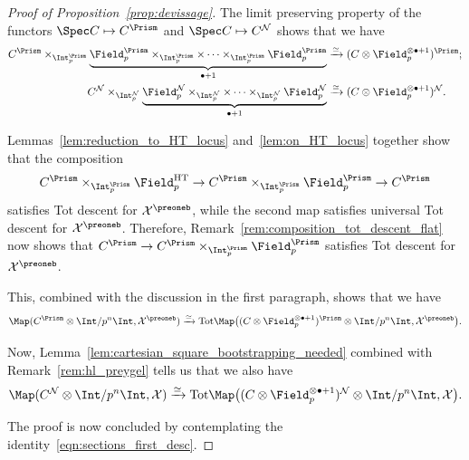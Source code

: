 \documentclass[10pt]{amsart}
\begin{document}
\begin{proof}
[Proof of Proposition~\ref{prop:devissage}]
The limit preserving property of the  functors $\Spec C\mapsto C^{\Prism}$ and $\Spec C \mapsto C^{\mathcal{N}}$ shows that we have
\begin{align*}
C^\Prism\times_{\Int_p^{\mathrm{\Prism}}}\underbrace{\Field_p^{\mathrm{\Prism}}\times_{\Int_p^{\mathrm{\Prism}}}\times\cdots\times_{\Int_p^{\mathrm{\Prism}}}\Field_p^{\mathrm{\Prism}}}_{\bullet+1} &\xrightarrow{\simeq} (C\otimes \Field_p^{\otimes \bullet +1})^{\Prism};\\
C^{\mathcal{N}}\times_{\Int_p^{\mathcal{N}}}\underbrace{\Field_p^{\mathcal{N}}\times_{\Int_p^{\mathcal{N}}}\times\cdots\times_{\Int_p^{\mathcal{N}}}\Field_p^{\mathcal{N}}}_{\bullet+1}   &\xrightarrow{\simeq}(C\otimes \Field_p^{\otimes \bullet +1})^{\mathcal{N}}.
\end{align*}

Lemmas~\ref{lem:reduction_to_HT_locus} and~\ref{lem:on_HT_locus} together show that the composition
\[
 C^{\Prism}\times_{\Int_p^{\Prism}}\Field_p^{\mathrm{HT}}\to C^{\Prism}\times_{\Int_p^{\Prism}}\Field_p^{\Prism}\to C^{\Prism}
\]
satisfies Tot descent for $\mathcal{X}^\preoneb$, while the second map satisfies universal Tot descent for $\mathcal{X}^\preoneb$. Therefore, Remark~\ref{rem:composition_tot_descent_flat} now shows that $C^{\Prism}\to C^{\Prism}\times_{\Int_p^{\Prism}}\Field_p^{\Prism}$ satisfies Tot descent for $\mathcal{X}^\preoneb$.

This, combined with the discussion in the first paragraph, shows that we have
\[
\Map(C^{\Prism}\otimes\Int/p^n\Int,\mathcal{X}^\preoneb)\xrightarrow{\simeq}\mathrm{Tot} \Map\bigl((C\otimes\Field_p^{\otimes\bullet+1})^{\Prism}\otimes\Int/p^n\Int,\mathcal{X}^\preoneb\bigr).
\]

Now, Lemma~\ref{lem:cartesian_square_bootstrapping_needed} combined with Remark~\ref{rem:hl_preygel} tells us that we also have
\[
\Map(C^{\mathcal{N}}\otimes\Int/p^n\Int,\mathcal{X})\xrightarrow{\simeq}\mathrm{Tot} \Map\bigl((C\otimes\Field_p^{\otimes\bullet+1})^{\mathcal{N}}\otimes\Int/p^n\Int,\mathcal{X}\bigr).
\]

The proof is now concluded by contemplating the identity~\eqref{eqn:sections_first_desc}.
\end{proof}
\end{document}
